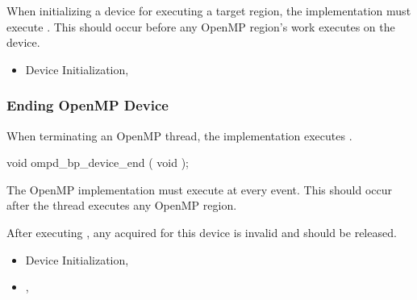 \descr

When initializing a device for executing a target region, the implementation must 
execute .
This should occur before any OpenMP region's work executes on the device.

\crossreferences
\begin{itemize}
\item
  Device Initialization, 
\end{itemize}





\subsubsection{Ending OpenMP Device}
\label{subsubsec:ompd_bp_device_end}

\summary

When terminating an OpenMP thread, the implementation 
executes .

\format
\begin{cspecific}
\begin{ompSyntax}
void ompd_bp_device_end ( void );
\end{ompSyntax}
\end{cspecific}


\descr

The OpenMP implementation must execute 
 at every  event.
This should occur after the thread executes any OpenMP region.

After 
executing , any  acquired for this
device is invalid and should be released.

\crossreferences
\begin{itemize}
\item
  Device Initialization, 
\item
  ,
\end{itemize}

